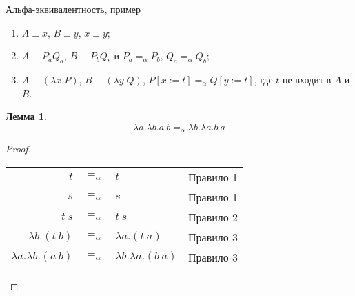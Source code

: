 \documentclass[aspectratio=169]{beamer}
\newtheorem{lmm}{Лемма}[section]
\begin{document}
\begin{frame}{Альфа-эквивалентность, пример}
\begin{enumerate}
\item \color{gray}$A \equiv x$, $B \equiv y$, $x \equiv y$;
\item \color{gray}$A \equiv P_a Q_a$, $B \equiv P_b Q_b$ и $P_a =_\alpha P_b$, $Q_a =_\alpha Q_b$;
\item \color{gray}$A \equiv (\lambda x.P)$, $B \equiv (\lambda y.Q)$, $P[x := t] =_\alpha Q[y := t]$, где $t$ не входит в $A$ и $B$.
\end{enumerate}\vspace{-0.2cm}\begin{lmm}\vspace{-0.3cm}
$$\lambda a.\lambda b.a\ b =_\alpha \lambda b.\lambda a.b\ a$$\vspace{-0.3cm}
\end{lmm}\vspace{-0.3cm}
\begin{proof}
\begin{center}\begin{tabular}{rcll}
  $t$ & $=_\alpha$ &$t$& Правило 1\\
  $s$ & $=_\alpha$ &$s$& Правило 1\\
  $t\ s$ & $=_\alpha$ &$t\ s$& Правило 2\\
  $\lambda b.(t\ b)$ & $=_\alpha$ &$\lambda a.(t\ a)$ & Правило 3\\
  $\lambda a.\lambda b.(a\ b)$ & $=_\alpha$ &$\lambda b.\lambda a.(b\ a)$ & Правило 3\\
\end{tabular}\end{center}\vspace{-0.3cm}
\end{proof}
\end{frame}
\end{document}
